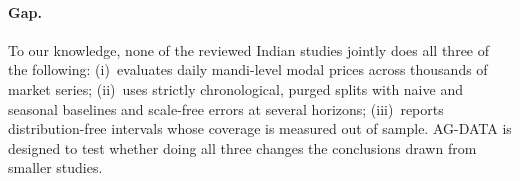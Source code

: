 \paragraph{Gap.}
To our knowledge, none of the reviewed Indian studies jointly does all three of the following:
(i)~evaluates daily mandi-level modal prices across thousands of market series;
(ii)~uses strictly chronological, purged splits with naive and seasonal baselines and scale-free errors at several horizons;
(iii)~reports distribution-free intervals whose coverage is measured out of sample.
AG-DATA is designed to test whether doing all three changes the conclusions drawn from smaller studies.

